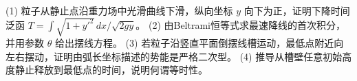 (1) 粒子从静止点沿重力场中光滑曲线下滑，纵向坐标 \(y\) 向下为正，证明下降时间泛函 \(T=\int \sqrt{1+y'^2}\,dx/\sqrt{2gy}\)。
(2) 由Beltrami恒等式求最速降线的首次积分，并用参数 \(\theta\) 给出摆线方程。
(3) 若粒子沿竖直平面倒摆线槽运动，最低点附近向左右摆动，证明由弧长坐标描述的势能是严格二次型。
(4) 推导从槽壁任意初始高度静止释放到最低点的时间，说明何谓等时性。
